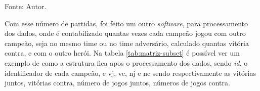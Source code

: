 \begin{table}[H]
\centering
\caption{Exemplo de \textit{subset} salvo no banco de dados}
\label{tab:subset-lol}
\small{Fonte: Autor.}
\end{table}

Com esse número de partidas, foi feito um outro \textit{software}, para processamento dos dados, onde é contabilizado quantas vezes cada campeão jogou com outro campeão, seja no mesmo time ou no time adversário, calculado quantas vitória contra, e com o outro herói. Na tabela \ref{tab:matriz-subset} é possível ver um exemplo de como a estrutura fica apos o processamento dos dados, sendo \textit{id}, o identificador de cada campeão, e vj, vc, nj e nc sendo respectivamente as vitórias juntos, vitórias contra, número de jogos juntos, números de jogos contra.

